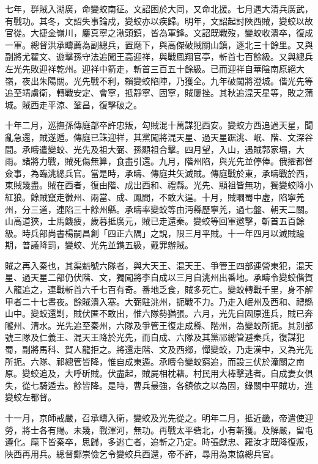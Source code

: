 \begin{pinyinscope}
七年，群賊入湖廣，命變蛟南征。文詔困於大同，又命北援。七月遇大清兵廣武，有戰功。其冬，文詔失事論戍，變蛟亦以疾歸。明年，文詔起討陜西賊，變蛟以故官從。大捷金嶺川，鏖真寧之湫頭鎮，皆為軍鋒。文詔既戰歿，變蛟收潰卒，復成一軍。總督洪承疇薦為副總兵，置麾下，與高傑破賊關山鎮，逐北三十餘里。又與副將尤翟文、遊擊孫守法追闖王高迎祥，與戰鳳翔官亭，斬首七百餘級。又與總兵左光先敗迎祥乾州。迎祥中箭走，斬首三百五十餘級。已而迎祥自華陰南原絕大嶺，夜出朱陽關。光先戰不利，賴變蛟陷陣，乃獲全。九年破闖將澄城。偕光先等追至靖虜衛，轉戰安定、會寧，抵靜寧、固寧，賊屢挫。其秋追混天星等，敗之蒲城。賊西走平涼、鞏昌，復擊破之。

十年二月，巡撫孫傳庭部卒許忠叛，勾賊混十萬謀犯西安。變蛟方西追過天星，聞亂急還，賊遂遁。傳庭已誅迎祥，其黨闖將混天星、過天星踞洮、岷、階、文深谷間。承疇遣變蛟、光先及祖大弼、孫顯祖合擊。四月望，入山，遇賊郭家壩，大雨。諸將力戰，賊死傷無算，食盡引還。九月，階州陷，與光先並停俸。俄擢都督僉事，為臨洮總兵官。當是時，承疇、傳庭共矢滅賊。傳庭戰於東，承疇戰於西，東賊幾盡。賊在西者，復由階、成出西和、禮縣。光先、顯祖皆無功，獨變蛟降小紅狼。餘賊竄走徽州、兩當、成、鳳間，不敢大逞。十月，賊瞷蜀中虛，陷寧羌州，分三道，連陷三十餘州縣。承疇率變蛟等由沔縣歷寧羌，過七盤、朝天二關。山高道狹，士馬饑疲，歲暮抵廣元，賊已走還秦。變蛟等回軍邀擊，斬首五百餘級。時兵部尚書楊嗣昌創「四正六隅」之說，限三月平賊。十一年四月以滅賊踰期，普議降罰，變蛟、光先並鐫五級，戴罪辦賊。

賊之再入秦也，其渠魁號六隊者，與大天王、混天王、爭管王四部連營東犯，混天星、過天星二部仍伏階、文，獨闖將李自成以三月自洮州出番地。承疇令變蛟偕賀人龍追之，連戰斬首六千七百有奇。番地乏食，賊多死亡。變蛟轉戰千里，身不解甲者二十七晝夜。餘賊潰入塞。大弼駐洮州，扼戰不力。乃走入岷州及西和、禮縣山中。變蛟還剿，賊伏匿不敢出，惟六隊勢猶張。六月，光先自固原進兵，賊已奔隴州、清水。光先追至秦州，六隊及爭管王復走成縣、階州，為變蛟所扼。其別部號三隊及仁義王、混天王降於光先，而自成、六隊及其黨祁總管避秦兵，復謀犯蜀，副將馬科、賀人龍拒之。將還走階、文及西鄉，憚變蛟，乃走漢中，又為光先所扼。六隊、祁總管皆降，惟自成東遁。承疇令變蛟窮追，而設三伏於潼關之南原。變蛟追及，大呼斫賊。伏盡起，賊屍相枕藉。村民用大棒擊逃者。自成妻女俱失，從七騎遁去。餘皆降。是時，曹兵最強，各鎮依之以為固，錄關中平賊功，進變蛟左都督。

十一月，京師戒嚴，召承疇入衛，變蛟及光先從之。明年二月，抵近畿，帝遣使迎勞，將士各有賜。未幾，戰渾河，無功。再戰太平砦北，小有斬獲。及解嚴，留屯遵化。麾下皆秦卒，思歸，多逃亡者，追斬之乃定。時張獻忠、羅汝才既降復叛，陜西再用兵。總督鄭崇儉乞令變蛟兵西還，帝不許，尋用為東協總兵官。


\end{pinyinscope}
